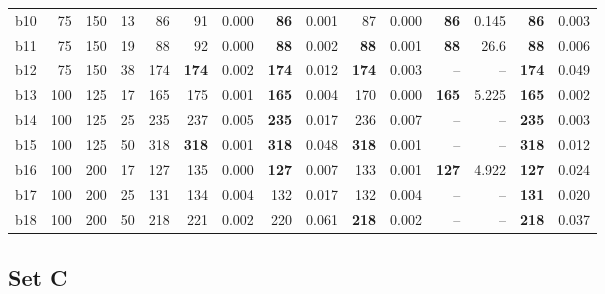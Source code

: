 \begin{longtable}{@{}lrrrr@{\hspace{9pt}}rr@{\hspace{9pt}}rr@{\hspace{9pt}}rr@{\hspace{9pt}}rr@{\hspace{9pt}}rr@{}}
b10 & 75 & 150 & 13 & 86 & 91 & 0.000 & \textbf{86} & 0.001 & 87 & 0.000 & \textbf{86} & 0.145 & \textbf{86} & 0.003\\
b11 & 75 & 150 & 19 & 88 & 92 & 0.000 & \textbf{88} & 0.002 & \textbf{88} & 0.001 & \textbf{88} & 26.6 & \textbf{88} & 0.006\\
b12 & 75 & 150 & 38 & 174 & \textbf{174} & 0.002 & \textbf{174} & 0.012 & \textbf{174} & 0.003 & -- & -- & \textbf{174} & 0.049\\
b13 & 100 & 125 & 17 & 165 & 175 & 0.001 & \textbf{165} & 0.004 & 170 & 0.000 & \textbf{165} & 5.225 & \textbf{165} & 0.002\\
b14 & 100 & 125 & 25 & 235 & 237 & 0.005 & \textbf{235} & 0.017 & 236 & 0.007 & -- & -- & \textbf{235} & 0.003\\
b15 & 100 & 125 & 50 & 318 & \textbf{318} & 0.001 & \textbf{318} & 0.048 & \textbf{318} & 0.001 & -- & -- & \textbf{318} & 0.012\\
b16 & 100 & 200 & 17 & 127 & 135 & 0.000 & \textbf{127} & 0.007 & 133 & 0.001 & \textbf{127} & 4.922 & \textbf{127} & 0.024\\
b17 & 100 & 200 & 25 & 131 & 134 & 0.004 & 132 & 0.017 & 132 & 0.004 & -- & -- & \textbf{131} & 0.020\\
b18 & 100 & 200 & 50 & 218 & 221 & 0.002 & 220 & 0.061 & \textbf{218} & 0.002 & -- & -- & \textbf{218} & 0.037\\
\bottomrule\end{longtable}\endgroup
{}\subsection*{Set C}
\begingroup\footnotesize\setlength{\tabcolsep}{2.6pt}\setlength{\LTpre}{2pt}
